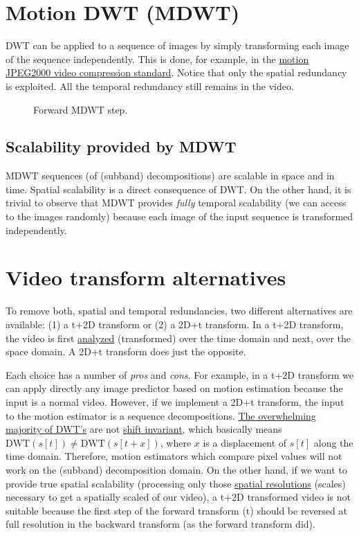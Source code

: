 \section{Motion DWT (MDWT)}
DWT can be applied to a sequence of images by simply transforming each
image of the sequence independently. This is done, for example, in the
\href{https://en.wikipedia.org/wiki/JPEG_2000}{motion JPEG2000 video
  compression standard}. Notice that only the spatial redundancy is
exploited. All the temporal redundancy still remains in the video.

\begin{figure}
\centering
{}
\caption{Forward MDWT step.}
\end{figure}



\subsection{Scalability provided by MDWT}
MDWT sequences (of (subband) decompositions) are scalable in space and
in time. Spatial scalability is a direct consequence of DWT. On the other
hand, it is trivial to observe that MDWT provides \emph{fully}
temporal scalability (we can access to the images randomly) because
each image of the input sequence is transformed independently.

\section{Video transform alternatives}
To remove both, spatial and temporal redundancies, two different
alternatives are available: (1) a t+2D transform or (2) a 2D+t
transform. In a t+2D transform, the video is first
\href{https://en.wikipedia.org/wiki/Digital_filter\#Analysis_techniques}{analyzed} (transformed)
over the time domain and next, over the space domain. A 2D+t transform
does just the opposite.

Each choice has a number of \emph{pros} and \emph{cons}. For example,
in a t+2D transform we can apply directly any image predictor based on
motion estimation because the input is a normal video. However, if we
implement a 2D+t transform, the input to the motion estimator is a
sequence decompositions.
\href{http://www.polyvalens.com/blog/wavelets/theory}{The overwhelming
  majority of DWT's} are not
\href{http://www.polyvalens.com/blog/wavelets/theory}{shift
  invariant}, which basically means $\text{DWT}(s[t]) \neq
\text{DWT}(s[t+x])$, where $x$ is a displacement of $s[t]$ along the
time domain.  Therefore, motion estimators which compare pixel values
will not work on the (subband) decomposition domain. On the other
hand, if we want to provide true spatial scalability (processing only
those
\href{https://en.wikipedia.org/wiki/Image_resolution\#Spatial_resolution}{spatial
  resolutions} (scales) necessary to get a spatially scaled of our
video), a t+2D transformed video is not suitable because the first
step of the forward transform (t) should be reversed at full
resolution in the backward transform (as the forward transform did).


